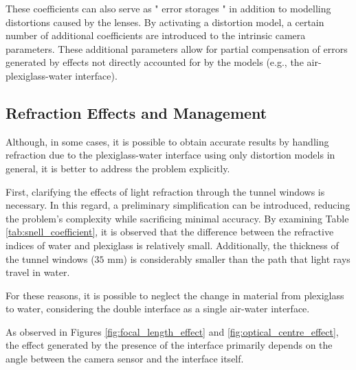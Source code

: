 These coefficients can also serve as " error storages " in addition to modelling distortions caused by the lenses. By activating a distortion model, a certain number of additional coefficients are introduced to the intrinsic camera parameters. These additional parameters allow for partial compensation of errors generated by effects not directly accounted for by the models (e.g., the air-plexiglass-water interface).

\subsection{Refraction Effects and Management}

Although, in some cases, it is possible to obtain accurate results by handling refraction due to the plexiglass-water interface using only distortion models in general, it is better to address the problem explicitly.

First, clarifying the effects of light refraction through the tunnel windows is necessary. In this regard, a preliminary simplification can be introduced, reducing the problem's complexity while sacrificing minimal accuracy. By examining Table \ref{tab:snell_coefficient}, it is observed that the difference between the refractive indices of water and plexiglass is relatively small. Additionally, the thickness of the tunnel windows ($35$ mm) is considerably smaller than the path that light rays travel in water.

\begin{table}[htbp]
  \centering
  \caption{Materials Refractive Indices .}
  \label{tab:snell_coefficient}
\end{table}

For these reasons, it is possible to neglect the change in material from plexiglass to water, considering the double interface as a single air-water interface.

As observed in Figures \ref{fig:focal_length_effect} and \ref{fig:optical_centre_effect}, the effect generated by the presence of the interface primarily depends on the angle between the camera sensor and the interface itself.

